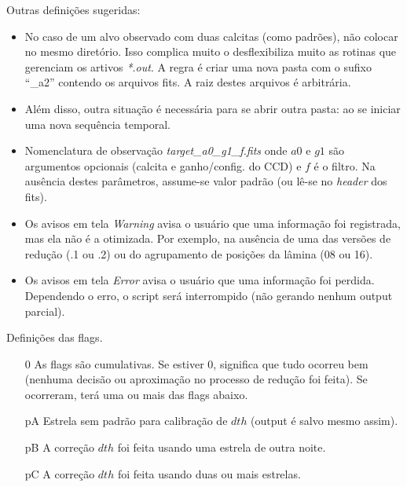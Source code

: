 Outras definições sugeridas:
\begin{itemize}
    \item No caso de um alvo observado com duas calcitas (como padrões), não
colocar no mesmo diretório. Isso complica muito o desflexibiliza muito as
rotinas que gerenciam os artivos \textit{*.out}. A regra é criar uma nova pasta
com o sufixo ``\_a2'' contendo os arquivos fits. A raiz destes arquivos é
arbitrária.
    \item Além disso, outra situação é necessária para se abrir outra pasta:
ao se iniciar uma nova sequência temporal.
    \item Nomenclatura de observação \textit{target\_a0\_g1\_f.fits} onde $a0$
e $g1$ são argumentos opcionais (calcita e ganho/config$.$ do CCD) e $f$ é o
filtro. Na ausência destes parâmetros, assume-se valor padrão (ou lê-se no
\textit{header} dos fits).
    \item Os avisos em tela \textit{Warning} avisa o usuário que uma informação
foi registrada, mas ela não é a otimizada. Por exemplo, na ausência de uma das
versões de redução (.1 ou .2) ou do agrupamento de posições da lâmina (08 ou
16).
    \item Os avisos em tela \textit{Error} avisa o usuário que uma informação
foi perdida. Dependendo o erro, o script será interrompido (não gerando nenhum
output parcial).
\end{itemize}

Definições das flags.
\begin{itemize}
    \item[0] As flags são cumulativas. Se estiver 0, significa que tudo ocorreu
bem (nenhuma decisão ou aproximação no processo de redução foi feita).
Se ocorreram, terá uma ou mais das flags abaixo.
    \item[pA] Estrela sem padrão para calibração de $dth$ (output é salvo mesmo
assim).
    \item[pB] A correção $dth$ foi feita usando uma estrela de outra noite.
    \item[pC] A correção $dth$ foi feita usando duas ou mais estrelas.
\end{itemize}

